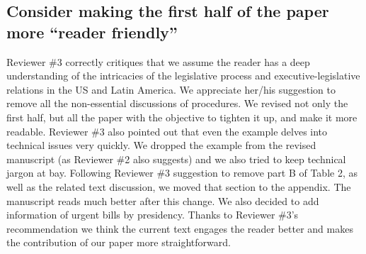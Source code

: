 \documentclass[article,letterpaper,times,12pt,listings-bw,microtype]{article}
\begin{document}
\subsection{Consider making the first half of the paper more ``reader friendly''}
Reviewer \#3 correctly critiques that we assume the reader has a deep understanding of the intricacies of the legislative process and executive-legislative relations in the US and Latin America. We appreciate her/his suggestion to remove all the non-essential discussions of procedures. We revised not only the first half, but all the paper with the objective to tighten it up, and make it more readable. Reviewer \#3 also pointed out that even the example delves into technical issues very quickly. We dropped the example from the revised manuscript (as Reviewer \#2 also suggests) and we also tried to keep technical jargon at bay. Following Reviewer \#3 suggestion to remove part B of Table 2, as well as the related text discussion, we moved that section to the appendix. The manuscript reads much better after this change. We also decided to add information of urgent bills by presidency. Thanks to Reviewer \#3's recommendation we think the current text engages the reader better and makes the contribution of our paper more straightforward.   

	

\end{document}
